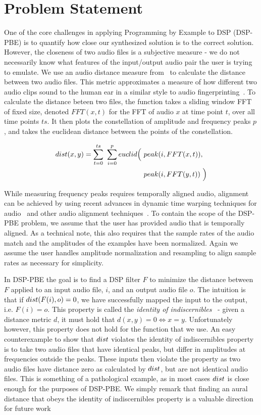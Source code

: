 
\section{Problem Statement}

One of the core challenges in applying Programming by Example to DSP (DSP-PBE) is to quantify how close our synthesized solution is to the correct solution.
However, the closeness of two audio files is a subjective measure - we do not necessarily know what features of the input/output audio pair the user is trying to emulate.
We use an audio distance measure from~\cite{SantolucitoFARM} to calculate the distance between two audio files.
This metric approximates a measure of how different two audio clips sound to the human ear in a similar style to audio fingerprinting~\cite{wang2003industrial,fingerprinting}.
To calculate the distance beteen two files, the function takes a sliding window FFT of fixed size, denoted $FFT(x,t)$ for the FFT of audio $x$ at time point $t$, over all time points $ts$.
It then plots the constellation of amplitude and frequency peaks $p$, and takes the euclidean distance between the points of the constellation.

%
\begin{align*}
\distFxn(x,y) =  \sum_{t=0}^{ts}\ \sum_{i=0}^{p} euclid\Big(\ &peak(i,FFT(x,t)), \\ &peak(i,FFT(y,t))\ \Big)
\end{align*}
%

While measuring frequency peaks requires temporally aligned audio, alignment can be achieved by using recent advances in dynamic time warping techniques for audio~\cite{carabias2015audio} and other audio alignment techniques~\cite{ArztL18}.
To contain the scope of the DSP-PBE problem, we assume that the user has provided audio that is temporally aligned.
As a technical note, this also requires that the sample rates of the audio match and the amplitudes of the examples have been normalized.
Again we assume the user handles amplitude normalization and resampling to align sample rates as necessary for simplicity.

In DSP-PBE the goal is to find a DSP filter $F$ to minimize the distance between $F$ applied to an input audio file, $i$, and an output audio file $o$.
The intuition is that if $dist(F(i),o) = 0$, we have successfully mapped the input to the output, i.e. $F(i) = o$.
This property is called the \textit{identity of indiscernibles}~\cite{frechet1906quelques} - given a distance metric $d$, it must hold that $d(x,y) = 0 \Leftrightarrow x = y$.
Unfortunately however, this property does not hold for the \distFxn function that we use.
An easy counterexample to show that $dist$ violates the identity of indiscernibles property is to take two audio files that have identical peaks, but differ in amplitudes at frequencies outside the peaks.
These inputs then violate the property as two audio files have distance zero as calculated by $dist$, but are not identical audio files.
This is something of a pathological example, as in most cases $dist$ is close enough for the purposes of DSP-PBE.
We simply remark that finding an aural distance that obeys the identity of indiscernibles property is a valuable direction for future work 

